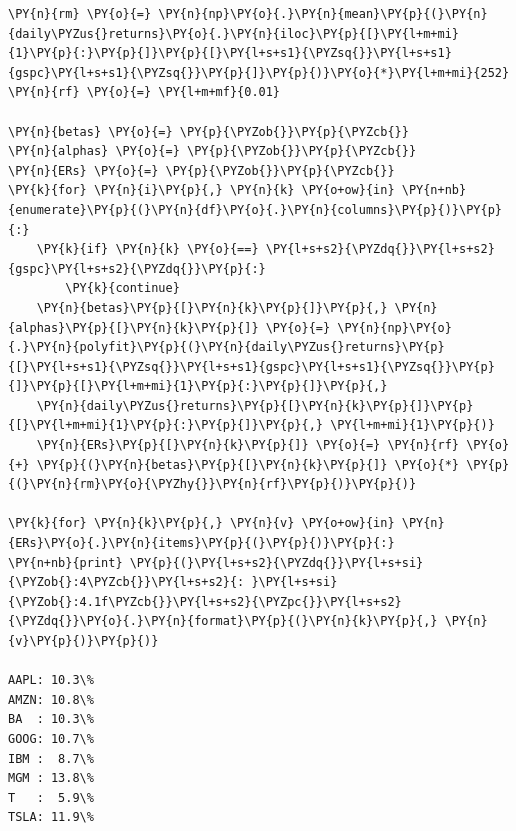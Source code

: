 \begin{codebox}
\begin{Verbatim}[commandchars=\\\{\}]
\PY{n}{rm} \PY{o}{=} \PY{n}{np}\PY{o}{.}\PY{n}{mean}\PY{p}{(}\PY{n}{daily\PYZus{}returns}\PY{o}{.}\PY{n}{iloc}\PY{p}{[}\PY{l+m+mi}{1}\PY{p}{:}\PY{p}{]}\PY{p}{[}\PY{l+s+s1}{\PYZsq{}}\PY{l+s+s1}{gspc}\PY{l+s+s1}{\PYZsq{}}\PY{p}{]}\PY{p}{)}\PY{o}{*}\PY{l+m+mi}{252}
\PY{n}{rf} \PY{o}{=} \PY{l+m+mf}{0.01} 
	
\PY{n}{betas} \PY{o}{=} \PY{p}{\PYZob{}}\PY{p}{\PYZcb{}}
\PY{n}{alphas} \PY{o}{=} \PY{p}{\PYZob{}}\PY{p}{\PYZcb{}}
\PY{n}{ERs} \PY{o}{=} \PY{p}{\PYZob{}}\PY{p}{\PYZcb{}}
\PY{k}{for} \PY{n}{i}\PY{p}{,} \PY{n}{k} \PY{o+ow}{in} \PY{n+nb}{enumerate}\PY{p}{(}\PY{n}{df}\PY{o}{.}\PY{n}{columns}\PY{p}{)}\PY{p}{:}
    \PY{k}{if} \PY{n}{k} \PY{o}{==} \PY{l+s+s2}{\PYZdq{}}\PY{l+s+s2}{gspc}\PY{l+s+s2}{\PYZdq{}}\PY{p}{:}
        \PY{k}{continue}
    \PY{n}{betas}\PY{p}{[}\PY{n}{k}\PY{p}{]}\PY{p}{,} \PY{n}{alphas}\PY{p}{[}\PY{n}{k}\PY{p}{]} \PY{o}{=} \PY{n}{np}\PY{o}{.}\PY{n}{polyfit}\PY{p}{(}\PY{n}{daily\PYZus{}returns}\PY{p}{[}\PY{l+s+s1}{\PYZsq{}}\PY{l+s+s1}{gspc}\PY{l+s+s1}{\PYZsq{}}\PY{p}{]}\PY{p}{[}\PY{l+m+mi}{1}\PY{p}{:}\PY{p}{]}\PY{p}{,} 
    \PY{n}{daily\PYZus{}returns}\PY{p}{[}\PY{n}{k}\PY{p}{]}\PY{p}{[}\PY{l+m+mi}{1}\PY{p}{:}\PY{p}{]}\PY{p}{,} \PY{l+m+mi}{1}\PY{p}{)}
    \PY{n}{ERs}\PY{p}{[}\PY{n}{k}\PY{p}{]} \PY{o}{=} \PY{n}{rf} \PY{o}{+} \PY{p}{(}\PY{n}{betas}\PY{p}{[}\PY{n}{k}\PY{p}{]} \PY{o}{*} \PY{p}{(}\PY{n}{rm}\PY{o}{\PYZhy{}}\PY{n}{rf}\PY{p}{)}\PY{p}{)} 

\PY{k}{for} \PY{n}{k}\PY{p}{,} \PY{n}{v} \PY{o+ow}{in} \PY{n}{ERs}\PY{o}{.}\PY{n}{items}\PY{p}{(}\PY{p}{)}\PY{p}{:} 
\PY{n+nb}{print} \PY{p}{(}\PY{l+s+s2}{\PYZdq{}}\PY{l+s+si}{\PYZob{}:4\PYZcb{}}\PY{l+s+s2}{: }\PY{l+s+si}{\PYZob{}:4.1f\PYZcb{}}\PY{l+s+s2}{\PYZpc{}}\PY{l+s+s2}{\PYZdq{}}\PY{o}{.}\PY{n}{format}\PY{p}{(}\PY{n}{k}\PY{p}{,} \PY{n}{v}\PY{p}{)}\PY{p}{)}

AAPL: 10.3\%
AMZN: 10.8\%
BA  : 10.3\%
GOOG: 10.7\%
IBM :  8.7\%
MGM : 13.8\%
T   :  5.9\%
TSLA: 11.9\%
\end{Verbatim}
\end{codebox}

